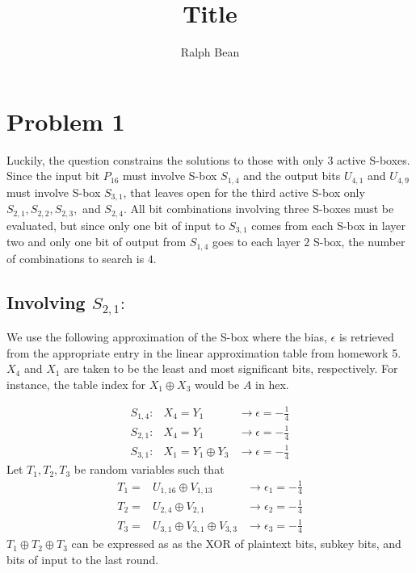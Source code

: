 \documentclass{elsart}
\begin{document}
\begin{frontmatter}

\title{Title}

\author{Ralph Bean}

\end{frontmatter}

\section{Problem 1}
Luckily, the question constrains the solutions to those with only $3$ 
active S-boxes.  Since the input bit $P_{16}$ must involve S-box
$S_{1,4}$ and the output bits $U_{4,1}$ and $U_{4,9}$ must involve S-box
$S_{3,1}$, that leaves open for the third active S-box only
$S_{2,1}, S_{2,2}, S_{2,3},$ and $S_{2,4}$.  All bit combinations involving
three S-boxes must be evaluated, but since only one bit of input to
$S_{3,1}$ comes from each S-box in layer two and only one bit of output
from $S_{1,4}$ goes to each layer $2$ S-box, the number of combinations
to search is $4$.

\subsection{Involving $S_{2,1}:$}
We use the following approximation of the S-box where the bias, $\epsilon$ is retrieved from the appropriate entry in the linear approximation table from homework 5.  $X_{4}$ and $X_{1}$ are taken to be the least and most significant bits, respectively.  For instance, the table index for $X_{1} \oplus X_{3}$ would be $A$ in hex.

\begin{eqnarray*}
S_{1,4}: &X_{4}=Y_{1} &\rightarrow \epsilon=-\frac{1}{4} \\
S_{2,1}: &X_{4}=Y_{1} &\rightarrow \epsilon=-\frac{1}{4} \\
S_{3,1}: &X_{1}=Y_{1} \oplus Y_{3} &\rightarrow \epsilon=-\frac{1}{4}
\end{eqnarray*}
Let $T_{1}, T_{2}, T_{3}$ be random variables such that
\begin{eqnarray*}
T_{1} = &U_{1,16} \oplus V_{1,13} &\rightarrow \epsilon_{1}=-\frac{1}{4} \\
T_{2} = &U_{2,4} \oplus V_{2,1} &\rightarrow \epsilon_{2}=-\frac{1}{4} \\
T_{3} = &U_{3,1} \oplus V_{3,1} 
  \oplus V_{3,3} &\rightarrow \epsilon_{3}=-\frac{1}{4}
\end{eqnarray*}
$T_{1} \oplus T_{2} \oplus T_{3}$ can be expressed as as the XOR of plaintext bits, subkey bits, and bits of input to the last round.
\end{document}
